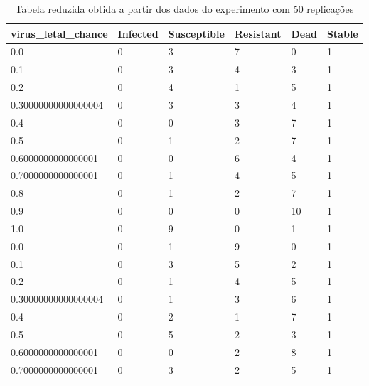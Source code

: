 \begin{table}[!ht]
    \centering
    \begin{tabular}{|l|l|l|l|l|l|}
    \hline
        virus\_letal\_chance & Infected & Susceptible & Resistant & Dead & Stable \\ \hline
        0.0 & 0 & 3 & 7 & 0 & 1 \\ \hline
        0.1 & 0 & 3 & 4 & 3 & 1 \\ \hline
        0.2 & 0 & 4 & 1 & 5 & 1 \\ \hline
        0.30000000000000004 & 0 & 3 & 3 & 4 & 1 \\ \hline
        0.4 & 0 & 0 & 3 & 7 & 1 \\ \hline
        0.5 & 0 & 1 & 2 & 7 & 1 \\ \hline
        0.6000000000000001 & 0 & 0 & 6 & 4 & 1 \\ \hline
        0.7000000000000001 & 0 & 1 & 4 & 5 & 1 \\ \hline
        0.8 & 0 & 1 & 2 & 7 & 1 \\ \hline
        0.9 & 0 & 0 & 0 & 10 & 1 \\ \hline
        1.0 & 0 & 9 & 0 & 1 & 1 \\ \hline
        0.0 & 0 & 1 & 9 & 0 & 1 \\ \hline
        0.1 & 0 & 3 & 5 & 2 & 1 \\ \hline
        0.2 & 0 & 1 & 4 & 5 & 1 \\ \hline
        0.30000000000000004 & 0 & 1 & 3 & 6 & 1 \\ \hline
        0.4 & 0 & 2 & 1 & 7 & 1 \\ \hline
        0.5 & 0 & 5 & 2 & 3 & 1 \\ \hline
        0.6000000000000001 & 0 & 0 & 2 & 8 & 1 \\ \hline
        0.7000000000000001 & 0 & 3 & 2 & 5 & 1 \\ \hline
    \end{tabular}
\caption{Tabela reduzida obtida a partir dos dados do experimento com 50 replicações}
\label{tab:tabelareduz:1} 
\end{table}



